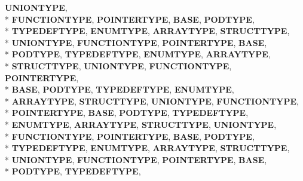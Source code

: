 \begin{DoxyCompactItemize}
{\bfseries U\-N\-I\-O\-N\-T\-Y\-P\-E}, 
\\*
{\bfseries F\-U\-N\-C\-T\-I\-O\-N\-T\-Y\-P\-E}, 
{\bfseries P\-O\-I\-N\-T\-E\-R\-T\-Y\-P\-E}, 
{\bfseries B\-A\-S\-E}, 
{\bfseries P\-O\-D\-T\-Y\-P\-E}, 
\\*
{\bfseries T\-Y\-P\-E\-D\-E\-F\-T\-Y\-P\-E}, 
{\bfseries E\-N\-U\-M\-T\-Y\-P\-E}, 
{\bfseries A\-R\-R\-A\-Y\-T\-Y\-P\-E}, 
{\bfseries S\-T\-R\-U\-C\-T\-T\-Y\-P\-E}, 
\\*
{\bfseries U\-N\-I\-O\-N\-T\-Y\-P\-E}, 
{\bfseries F\-U\-N\-C\-T\-I\-O\-N\-T\-Y\-P\-E}, 
{\bfseries P\-O\-I\-N\-T\-E\-R\-T\-Y\-P\-E}, 
{\bfseries B\-A\-S\-E}, 
\\*
{\bfseries P\-O\-D\-T\-Y\-P\-E}, 
{\bfseries T\-Y\-P\-E\-D\-E\-F\-T\-Y\-P\-E}, 
{\bfseries E\-N\-U\-M\-T\-Y\-P\-E}, 
{\bfseries A\-R\-R\-A\-Y\-T\-Y\-P\-E}, 
\\*
{\bfseries S\-T\-R\-U\-C\-T\-T\-Y\-P\-E}, 
{\bfseries U\-N\-I\-O\-N\-T\-Y\-P\-E}, 
{\bfseries F\-U\-N\-C\-T\-I\-O\-N\-T\-Y\-P\-E}, 
{\bfseries P\-O\-I\-N\-T\-E\-R\-T\-Y\-P\-E}, 
\\*
{\bfseries B\-A\-S\-E}, 
{\bfseries P\-O\-D\-T\-Y\-P\-E}, 
{\bfseries T\-Y\-P\-E\-D\-E\-F\-T\-Y\-P\-E}, 
{\bfseries E\-N\-U\-M\-T\-Y\-P\-E}, 
\\*
{\bfseries A\-R\-R\-A\-Y\-T\-Y\-P\-E}, 
{\bfseries S\-T\-R\-U\-C\-T\-T\-Y\-P\-E}, 
{\bfseries U\-N\-I\-O\-N\-T\-Y\-P\-E}, 
{\bfseries F\-U\-N\-C\-T\-I\-O\-N\-T\-Y\-P\-E}, 
\\*
{\bfseries P\-O\-I\-N\-T\-E\-R\-T\-Y\-P\-E}, 
{\bfseries B\-A\-S\-E}, 
{\bfseries P\-O\-D\-T\-Y\-P\-E}, 
{\bfseries T\-Y\-P\-E\-D\-E\-F\-T\-Y\-P\-E}, 
\\*
{\bfseries E\-N\-U\-M\-T\-Y\-P\-E}, 
{\bfseries A\-R\-R\-A\-Y\-T\-Y\-P\-E}, 
{\bfseries S\-T\-R\-U\-C\-T\-T\-Y\-P\-E}, 
{\bfseries U\-N\-I\-O\-N\-T\-Y\-P\-E}, 
\\*
{\bfseries F\-U\-N\-C\-T\-I\-O\-N\-T\-Y\-P\-E}, 
{\bfseries P\-O\-I\-N\-T\-E\-R\-T\-Y\-P\-E}, 
{\bfseries B\-A\-S\-E}, 
{\bfseries P\-O\-D\-T\-Y\-P\-E}, 
\\*
{\bfseries T\-Y\-P\-E\-D\-E\-F\-T\-Y\-P\-E}, 
{\bfseries E\-N\-U\-M\-T\-Y\-P\-E}, 
{\bfseries A\-R\-R\-A\-Y\-T\-Y\-P\-E}, 
{\bfseries S\-T\-R\-U\-C\-T\-T\-Y\-P\-E}, 
\\*
{\bfseries U\-N\-I\-O\-N\-T\-Y\-P\-E}, 
{\bfseries F\-U\-N\-C\-T\-I\-O\-N\-T\-Y\-P\-E}, 
{\bfseries P\-O\-I\-N\-T\-E\-R\-T\-Y\-P\-E}, 
{\bfseries B\-A\-S\-E}, 
\\*
{\bfseries P\-O\-D\-T\-Y\-P\-E}, 
{\bfseries T\-Y\-P\-E\-D\-E\-F\-T\-Y\-P\-E}, 

\end{DoxyCompactItemize}

